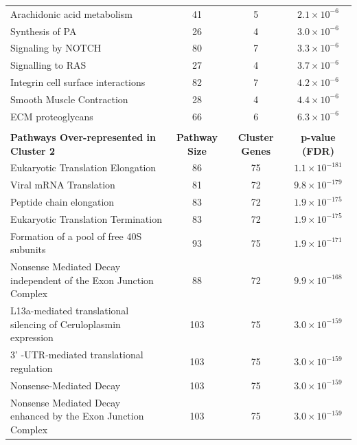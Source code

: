 \begin{table}[!hp]
{\begin{tabular}{lccc}
  Arachidonic acid metabolism &  41 &   5 & $2.1 \times 10^{-6}$ \\
  \rowcolor{Cluster_Blue!20} 
  Synthesis of PA &  26 &   4 & $3.0 \times 10^{-6}$ \\
  \rowcolor{Cluster_Blue!15} 
  Signaling by NOTCH &  80 &   7 & $3.3 \times 10^{-6}$ \\
  \rowcolor{Cluster_Blue!20} 
  Signalling to RAS &  27 &   4 & $3.7 \times 10^{-6}$ \\
  \rowcolor{Cluster_Blue!15} 
  Integrin cell surface interactions &  82 &   7 & $4.2 \times 10^{-6}$ \\
  \rowcolor{Cluster_Blue!20} 
  Smooth Muscle Contraction &  28 &   4 & $4.4 \times 10^{-6}$ \\
  \rowcolor{Cluster_Blue!15} 
  ECM proteoglycans &  66 &   6 & $6.3 \times 10^{-6}$ \\ 
  \hline
  \\
  \cellcolor{white} \large{\textbf{Pathways Over-represented in Cluster 2}} & \large{\textbf{Pathway Size}} & \large{\textbf{Cluster Genes}} & \large{\textbf{p-value (FDR)}} \\ %
  \hline
  \rowcolor{Cluster_Green!20}
  Eukaryotic Translation Elongation &  86 &  75 & $1.1 \times 10^{-181}$ \\
  \rowcolor{Cluster_Green!15} 
  Viral mRNA Translation &  81 &  72 & $9.8 \times 10^{-179}$ \\
  \rowcolor{Cluster_Green!20} 
  Peptide chain elongation &  83 &  72 & $1.9 \times 10^{-175}$ \\
  \rowcolor{Cluster_Green!15} 
  Eukaryotic Translation Termination &  83 &  72 & $1.9 \times 10^{-175}$ \\
  \rowcolor{Cluster_Green!20} 
  Formation of a pool of free 40S subunits &  93 &  75 & $1.9 \times 10^{-171}$ \\
  \rowcolor{Cluster_Green!15} 
  Nonsense Mediated Decay independent of the Exon Junction Complex &  88 &  72 & $9.9 \times 10^{-168}$ \\
  \rowcolor{Cluster_Green!20} 
  L13a-mediated translational silencing of Ceruloplasmin expression & 103 &  75 & $3.0 \times 10^{-159}$ \\
  \rowcolor{Cluster_Green!15} 
  3' -UTR-mediated translational regulation & 103 &  75 & $3.0 \times 10^{-159}$ \\
  \rowcolor{Cluster_Green!20} 
  Nonsense-Mediated Decay & 103 &  75 & $3.0 \times 10^{-159}$ \\
  \rowcolor{Cluster_Green!15} 
  Nonsense Mediated Decay enhanced by the Exon Junction Complex & 103 &  75 & $3.0 \times 10^{-159}$ \\

\end{tabular}}
\end{table}
